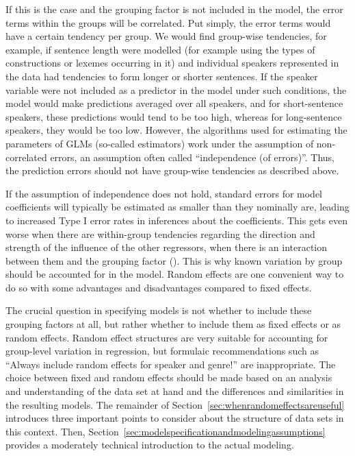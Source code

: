 If this is the case and the grouping factor is not included in the model, the error terms within the groups will be correlated.
Put simply, the error terms would have a certain tendency per group.
We would find group-wise tendencies, for example, if sentence length were modelled (for example using the types of constructions or lexemes occurring in it) and individual speakers represented in the data had tendencies to form longer or shorter sentences.
If the speaker variable were not included as a predictor in the model under such conditions, the model would make predictions averaged over all speakers, and for short-sentence speakers, these predictions would tend to be too high, whereas for long-sentence speakers, they would be too low.
However, the algorithms used for estimating the parameters of GLMs (so-called estimators) work under the assumption of non-correlated errors, an assumption often called ``independence (of errors)''.
Thus, the prediction errors should not have group-wise tendencies as described above.

If the assumption of independence does not hold, standard errors for model coefficients will typically be estimated as smaller than they nominally are, leading to increased Type I error rates in inferences about the coefficients.
This gets even worse when there are within-group tendencies regarding the direction and strength of the influence of the other regressors, \ie when there is an interaction between them and the grouping factor (\eg \citealt{SchielzethForstmeier2009}).
This is why known variation by group should be accounted for in the model.
Random effects are one convenient way to do so with some advantages and disadvantages compared to fixed effects.

The crucial question in specifying models is not whether to include these grouping factors at all, but rather whether to include them as fixed effects or as random effects.
Random effect structures are very suitable for accounting for group-level variation in regression, but formulaic recommendations such as ``Always include random effects for speaker and genre!'' are inappropriate.
The choice between fixed and random effects should be made based on an analysis and understanding of the data set at hand and the differences and similarities in the resulting models.
The remainder of Section~\ref{sec:whenrandomeffectsareuseful} introduces three important points to consider about the structure of data sets in this context.
Then, Section~\ref{sec:modelspecificationandmodelingassumptions} provides a moderately technical introduction to the actual modeling.



